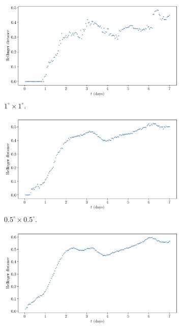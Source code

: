 \begin{figure}
	\begin{center}
		\begin{subfigure}{0.49\textwidth}
			\includegraphics[width=\textwidth]{chp06_applications/figures/gulf_stream/traj_stoch_hell_dist_1.0}
			\caption{\(1^\circ \times 1^\circ\).}
		\end{subfigure}
		\begin{subfigure}{0.49\textwidth}
			\includegraphics[width=\textwidth]{chp06_applications/figures/gulf_stream/traj_stoch_hell_dist_0.5}
			\caption{\(0.5^\circ \times 0.5^\circ\).}
		\end{subfigure}
		\begin{subfigure}{0.49\textwidth}
			\includegraphics[width=\textwidth]{chp06_applications/figures/gulf_stream/traj_stoch_hell_dist_0.125}

\end{subfigure}
\end{center}
\end{figure}
